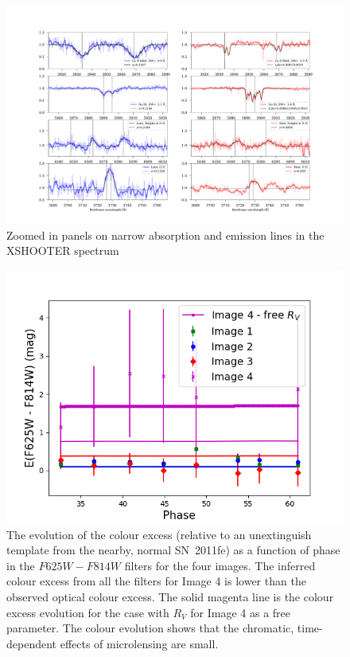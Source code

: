 \documentclass[a4paper,fleqn,usenatbib]{mnras}
\begin{document}

\begin{figure}
	\centering
	\caption{Zoomed in panels on narrow absorption and emission lines in the XSHOOTER spectrum
	\label{fig:spec_panels}}
	\includegraphics[width=\textwidth]{spec_panels.pdf}
\end{figure}



\begin{figure}
    \centering
    \includegraphics[width=.5\textwidth]{ColourExcess_11fe_comparison_fid.png}
    \caption{The evolution of the colour excess (relative to an unextinguish template from the nearby, normal SN~2011fe) as a function of phase in the $F625W - F814W$ filters for the four images. The inferred colour excess from all the filters for Image 4 is lower than the observed optical colour excess. The solid magenta line is the colour excess evolution for the case with $R_V$ for Image 4 as a free parameter.  The colour evolution shows that the chromatic, time-dependent effects of microlensing are small.}
    \label{fig:colour_evolution}
\end{figure}
\end{document}
